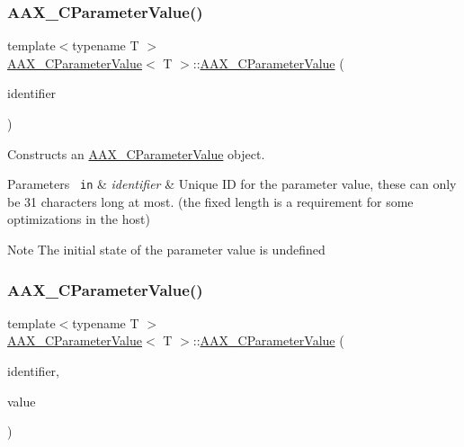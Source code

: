 \subsubsection{\texorpdfstring{AAX\_CParameterValue()}{AAX\_CParameterValue()}\hspace{0.1cm}{\footnotesize\ttfamily [1/3]}}
{\footnotesize\ttfamily template$<$typename T $>$ \\
\mbox{\hyperlink{a01533}{A\+A\+X\+\_\+\+C\+Parameter\+Value}}$<$ T $>$\+::\mbox{\hyperlink{a01533}{A\+A\+X\+\_\+\+C\+Parameter\+Value}} (\begin{DoxyParamCaption}\item[{\mbox{\hyperlink{a00392_a1440c756fe5cb158b78193b2fc1780d1}{A\+A\+X\+\_\+\+C\+Param\+ID}}}]{identifier }\end{DoxyParamCaption})\hspace{0.3cm}{\ttfamily [explicit]}}



Constructs an \mbox{\hyperlink{a01533}{A\+A\+X\+\_\+\+C\+Parameter\+Value}} object. 


\begin{DoxyParams}[1]{Parameters}
\mbox{\texttt{ in}}  & {\em identifier} & Unique ID for the parameter value, these can only be 31 characters long at most. (the fixed length is a requirement for some optimizations in the host)\\
\hline
\end{DoxyParams}
\begin{DoxyNote}{Note}
The initial state of the parameter value is undefined 
\end{DoxyNote}
\mbox{\label{a01533_a7d1e7a3e8977f19e70c468a6ca60f5ca}} 
\subsubsection{\texorpdfstring{AAX\_CParameterValue()}{AAX\_CParameterValue()}\hspace{0.1cm}{\footnotesize\ttfamily [2/3]}}
{\footnotesize\ttfamily template$<$typename T $>$ \\
\mbox{\hyperlink{a01533}{A\+A\+X\+\_\+\+C\+Parameter\+Value}}$<$ T $>$\+::\mbox{\hyperlink{a01533}{A\+A\+X\+\_\+\+C\+Parameter\+Value}} (\begin{DoxyParamCaption}\item[{\mbox{\hyperlink{a00392_a1440c756fe5cb158b78193b2fc1780d1}{A\+A\+X\+\_\+\+C\+Param\+ID}}}]{identifier,  }\item[{const T \&}]{value }\end{DoxyParamCaption})\hspace{0.3cm}{\ttfamily [explicit]}}



